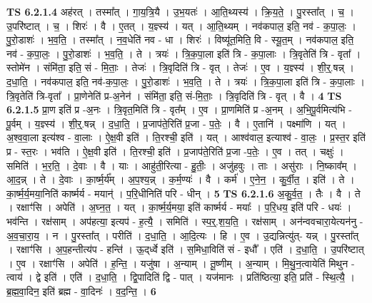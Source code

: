 \documentclass[17pt]{extarticle}
\begin{document}
                  \newline
                                \textbf{ TS 6.2.1.4} \newline
                  अह॑रत् । तस्मा᳚त् । गा॒य॒त्रि॒यै । उ॒भ॒यतः॑ । आ॒ति॒थ्यस्य॑ । क्रि॒य॒ते॒ । पु॒रस्ता᳚त् । च॒ । उ॒परि॑ष्टात् । च॒ । शिरः॑ । वै । ए॒तत् । य॒ज्ञ्स्य॑ । यत् । आ॒ति॒थ्यम् । नव॑कपाल॒ इति॒ नव॑ - क॒पा॒लः॒ । पु॒रो॒डाशः॑ । भ॒व॒ति॒ । तस्मा᳚त् । न॒व॒धेति॑ नव - धा । शिरः॑ । विष्यू॑त॒मिति॒ वि - स्यू॒त॒म् । नव॑कपाल॒ इति॒ नव॑ - क॒पा॒लः॒ । पु॒रो॒डाशः॑ । भ॒व॒ति॒ । ते । त्रयः॑ । त्रि॒क॒पा॒ला इति॑ त्रि - क॒पा॒लाः । त्रि॒वृतेति॑ त्रि - वृता᳚ । स्तोमे॑न । संमि॑ता॒ इति॒ सं - मि॒ताः॒ । तेजः॑ । त्रि॒वृदिति॑ त्रि - वृत् । तेजः॑ । ए॒व । य॒ज्ञ्स्य॑ । शी॒र्॒.षन्न् । द॒धा॒ति॒ । नव॑कपाल॒ इति॒ नव॑-क॒पा॒लः॒ । पु॒रो॒डाशः॑ । भ॒व॒ति॒ । ते । त्रयः॑ । त्रि॒क॒पा॒ला इति॑ त्रि - क॒पा॒लाः । त्रि॒वृतेति॑ त्रि-वृता᳚ । प्रा॒णेनेति॑ प्र-अ॒नेन॑ । संमि॑ता॒ इति॒ सं-मि॒ताः॒ । त्रि॒वृदिति॑ त्रि - वृत् । वै । \textbf{  4} \newline
                  \newline
                                \textbf{ TS 6.2.1.5} \newline
                  प्रा॒ण इति॑ प्र -अ॒नः । त्रि॒वृत॒मिति॑ त्रि - वृत᳚म् । ए॒व । प्रा॒णमिति॑ प्र -अ॒नम् । अ॒भि॒पू॒र्वमित्य॑भि - पू॒र्वम् । य॒ज्ञ्स्य॑ । शी॒र्॒.षन्न् । द॒धा॒ति॒ । प्र॒जाप॑ते॒रिति॑ प्र॒जा - प॒तेः॒ । वै । ए॒तानि॑ । पक्ष्मा॑णि । यत् । अ॒श्व॒वा॒ला इत्य॑श्व - वा॒लाः । ऐ॒क्ष॒वी इति॑ । ति॒रश्ची॒ इति॑ । यत् । आश्व॑वाल॒ इत्याश्व॑ - वा॒लः॒ । प्र॒स्त॒र इति॑ प्र - स्त॒रः । भव॑ति । ऐ॒क्ष॒वी इति॑ । ति॒रश्ची॒ इति॑ । प्र॒जाप॑ते॒रिति॑ प्र॒जा -प॒तेः॒ । ए॒व । तत् । चक्षुः॑ । समिति॑ । भ॒र॒ति॒ । दे॒वाः । वै । याः । आहु॑ती॒रित्या - हु॒तीः॒ । अजु॑हवुः । ताः । असु॑राः । नि॒ष्काव᳚म् । आ॒द॒न्न् । ते । दे॒वाः । का॒र्ष्म॒र्य᳚म् । अ॒प॒श्य॒न्न् । क॒र्म॒ण्यः॑ । वै । कर्म॑ । ए॒ने॒न॒ । कु॒र्वी॒त॒ । इति॑ । ते । का॒र्ष्म॒र्य॒मया॒निति॑ कार्ष्मर्य - मयान्॑ । प॒रि॒धीनिति॑ परि - धीन् । \textbf{  5} \newline
                  \newline
                                \textbf{ TS 6.2.1.6} \newline
                  अ॒कु॒र्व॒त॒ । तैः । वै । ते । रक्षाꣳ॑सि । अपेति॑ । अ॒घ्न॒त॒ । यत् । का॒र्ष्म॒र्य॒मया॒ इति॑ कार्ष्मर्य - मयाः᳚ । प॒रि॒धय॒ इति॑ परि - धयः॑ । भव॑न्ति । रक्ष॑साम् । अप॑हत्या॒ इत्यप॑ - ह॒त्यै॒ । समिति॑ । स्प॒र्॒.श॒य॒ति॒ । रक्ष॑साम् । अन॑न्ववचारा॒येत्यन॑नु - अ॒व॒चा॒रा॒य॒ । न । पु॒रस्ता᳚त् । परीति॑ । द॒धा॒ति॒ । आ॒दि॒त्यः । हि । ए॒व । उ॒द्यन्नित्यु॑त्- यन्न् । पु॒रस्ता᳚त् । रक्षाꣳ॑सि । अ॒प॒हन्तीत्य॑प - हन्ति॑ । ऊ॒द्‌र्ध्वे इति॑ । स॒मिधा॒विति॑ सं - इधौ᳚ । एति॑ । द॒धा॒ति॒ । उ॒परि॑ष्टात् । ए॒व । रक्षाꣳ॑सि । अपेति॑ । ह॒न्ति॒ । यजु॑षा । अ॒न्याम् । तू॒ष्णीम् । अ॒न्याम् । मि॒थु॒न॒त्वायेति॑ मिथुन - त्वाय॑ । द्वे इति॑ । एति॑ । द॒धा॒ति॒ । द्वि॒पादिति॑ द्वि - पात् । यज॑मानः । प्रति॑ष्ठित्या॒ इति॒ प्रति॑ - स्थि॒त्यै॒ । ब्र॒ह्म॒वा॒दिन॒ इति॑ ब्रह्म - वा॒दिनः॑ । व॒द॒न्ति॒ । \textbf{  6} \newline
\end{document}
